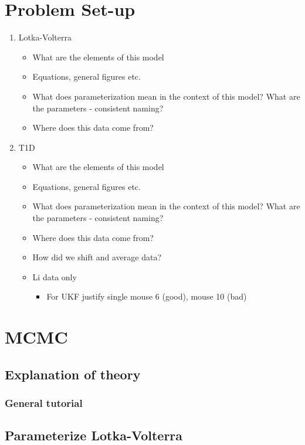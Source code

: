 \documentclass{article}
\begin{document}
\section{Problem Set-up}
\begin{enumerate}
    \item Lotka-Volterra
    \begin{itemize}
    \item What are the elements of this model
    \item Equations, general figures etc.
    \item What does parameterization mean in the context of this model? What are the parameters - consistent naming?
    \item Where does this data come from?
\end{itemize}
    \item T1D
    \begin{itemize}
    \item What are the elements of this model
    \item Equations, general figures etc.
    \item What does parameterization mean in the context of this model? What are the parameters - consistent naming?
    \item Where does this data come from?
    \item How did we shift and average data?
    \item Li data only
    \begin{itemize}
        \item For UKF justify single mouse 6 (good), mouse 10 (bad)
    \end{itemize}
\end{itemize}
\end{enumerate}


\section{MCMC}
\subsection{Explanation of theory}
\subsubsection{General tutorial}
\subsection{Parameterize Lotka-Volterra}
\end{document}
